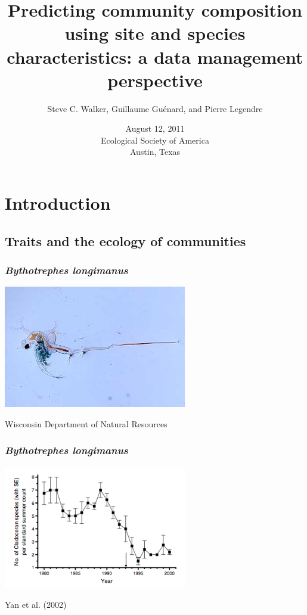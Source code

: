 \documentclass{beamer}
\title[Data management]{Predicting community composition using site and species characteristics:  a data management perspective}
\author[Steve C. Walker \\ Guillaume Gu\'{e}nard \\ Pierre Legendre]{Steve C. Walker, Guillaume Gu\'{e}nard, and Pierre Legendre}
\institute[Montr\'{e}al]{\insertlogo \\ D\'{e}partement de Sciences Biologiques}
\date[August 12, 2011]{August 12, 2011 \\ Ecological Society of America \\ Austin, Texas}
\numberwithin{exercise}{section}
\begin{document}
\maketitle

\section{Introduction}

\subsection[Traits and ecology]{Traits and the ecology of communities}

\begin{frame}
\frametitle{\textit{Bythotrephes longimanus}}
\begin{center}
\includegraphics[width=8cm]{waterflea}
\end{center}
\vspace{0.5cm}
\footnotesize{Wisconsin Department of Natural Resources}
\end{frame}

\begin{frame}
\frametitle{\textit{Bythotrephes longimanus}}
\begin{center}
\includegraphics[width=8cm]{Yan}
\end{center}
\vspace{0.5cm}
\footnotesize{Yan et al. (2002)}
\end{frame}
\end{document}
